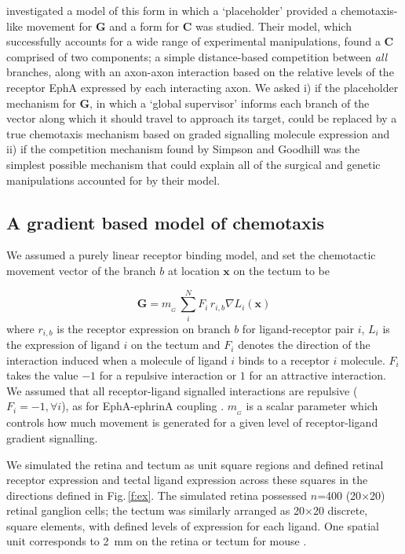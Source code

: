 \documentclass[9pt,lineno]{elife}
\begin{document}
\citet{simpson_simple_2011} investigated a model of this form in which a `placeholder' provided a chemotaxis-like movement for $\mathbf{G}$ and a form for $\mathbf{C}$ was studied.
Their model, which successfully accounts for a wide range of experimental manipulations, found a $\mathbf{C}$ comprised of two components; a simple distance-based competition between \emph{all} branches, along with an axon-axon interaction based on the relative levels of the receptor EphA expressed by each interacting axon.  
We asked i) if the placeholder mechanism for $\mathbf{G}$, in which a `global supervisor' informs each branch of the vector along which it should travel to approach its target, could be replaced by a true chemotaxis mechanism based on graded signalling molecule expression and ii) if the competition mechanism found by Simpson and Goodhill was the simplest possible mechanism that could explain all of the surgical and genetic manipulations accounted for by their model.

\subsection*{A gradient based model of chemotaxis}

We assumed a purely linear receptor binding model, and set the chemotactic movement vector of the branch $b$ at location $\mathbf{x}$ on the tectum to be

\begin{equation}\label{e:G}
\mathbf{G} = m_{\!_G}\,\sum_i^N F_i\,r_{i,b} \nabla L_i(\mathbf{x})
\end{equation}
%
where $r_{i,b}$ is the receptor expression on branch $b$ for ligand-receptor pair $i$, $L_i$ is the expression of ligand $i$ on the tectum and $F_i$ denotes the direction of the interaction induced when a molecule of ligand $i$ binds to a receptor $i$ molecule. 
$F_i$ takes the value $-1$ for a repulsive interaction or $1$ for an attractive interaction.
%
We assumed that all receptor-ligand signalled interactions are repulsive ($F_i=-1, \forall i$), as for EphA-ephrinA coupling \citep{drescher_vitro_1995,nakamoto_topographically_1996}.
%
$m_{\!_G}$ is a scalar parameter which controls how much movement is generated for a given level of receptor-ligand gradient signalling.

We simulated the retina and tectum as unit square regions and defined retinal receptor expression and tectal ligand expression across these squares in the directions defined in Fig.\,\ref{f:ex}. 
The simulated retina possessed $n$=400 (20$\times$20) retinal ganglion cells; the tectum was similarly arranged as 20$\times$20 discrete, square elements, with defined levels of expression for each ligand. 
One spatial unit corresponds to 2~mm on the retina or tectum for mouse \citep{reber_relative_2004}.
\end{document}
